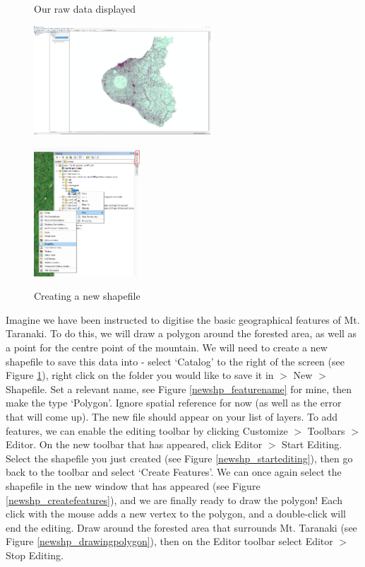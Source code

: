 \documentclass{article}
\begin{document}
\begin{figure}[h]
  \centering
  \begin{minipage}[b]{0.4\textwidth}
    \centering
    \caption{Our raw data displayed}
    \includegraphics[width=250px]{images/part1/rawdata.PNG}
    \label{rawdata}
  \end{minipage}
  \hfill
  \begin{minipage}[b]{0.4\textwidth}
    \centering
    \caption{Creating a new shapefile}
    \includegraphics[width=150px]{images/part1/newshp_catalog.PNG}
    \label{newshp_catalog}
  \end{minipage}
\end{figure}

Imagine we have been instructed to digitise the basic geographical features of Mt. Taranaki. To do this, we will draw a polygon around the forested area, as well as a point for the centre point of the mountain. We will need to create a new shapefile to save this data into - select `Catalog' to the right of the screen (see Figure \ref{newshp_catalog}), right click on the folder you would like to save it in $>$ New $>$ Shapefile. Set a relevant name, see Figure \ref{newshp_featurename} for mine, then make the type `Polygon'. Ignore spatial reference for now (as well as the error that will come up). The new file should appear on your list of layers. To add features, we can enable the editing toolbar by clicking Customize $>$ Toolbars $>$ Editor. On the new toolbar that has appeared, click Editor $>$ Start Editing. Select the shapefile you just created (see Figure \ref{newshp_startediting}), then go back to the toolbar and select `Create Features'. We can once again select the shapefile in the new window that has appeared (see Figure \ref{newshp_createfeatures}), and we are finally ready to draw the polygon! Each click with the mouse adds a new vertex to the polygon, and a double-click will end the editing. Draw around the forested area that surrounds Mt. Taranaki (see Figure \ref{newshp_drawingpolygon}), then on the Editor toolbar select Editor $>$ Stop Editing.\\
\end{document}
